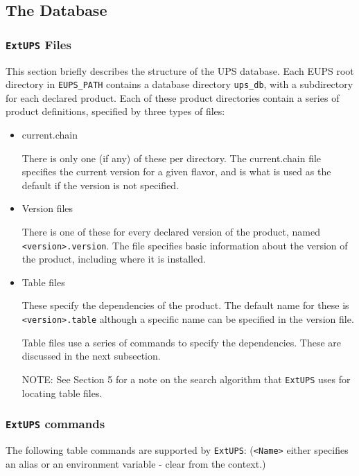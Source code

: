 \documentclass{article}
\newcommand{\code}[1]{\texttt{#1}}
\newcommand{\file}[1]{\texttt{#1}}
\newcommand{\eups}{\code{ExtUPS}}
\begin{document}
\subsection{The Database}

\subsubsection{\eups{} Files}

This section briefly describes the structure of the UPS database. Each
EUPS root directory in \code{EUPS\_PATH} contains a database directory
\code{ups\_db}, with a subdirectory for each declared product.  Each
of these product directories contain a series of product definitions,
specified by three types of files:

\begin{itemize}
  \item current.chain

    There is only one (if any) of these per directory.  The
    current.chain file specifies the current version for a given
    flavor, and is what is used as the default if the version is not
    specified.

  \item Version files

    There is one of these for every declared version of the product,
    named \file{<version>.version}. The file specifies basic information
    about the version of the product, including where it is installed.

  \item Table files

    These specify the dependencies of the product. The default name
    for these is \file{<version>.table} although a specific name can be specified in the
    version file.

    Table files use a series of commands to specify the dependencies. These are
    discussed in the next subsection.

    NOTE: See Section 5 for a note on the search algorithm that \eups{} uses for 
    locating table files.
\end{itemize}

\subsubsection{\eups{} commands}

The following table commands are supported by \eups{}: (\code{<Name>} either specifies an
alias or an environment variable - clear from the context.)
\end{document}
